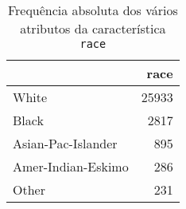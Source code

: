 \begin{table}
\centering
\caption{Frequência absoluta dos vários atributos da característica \texttt{race}}
\begin{tabular}{lr}
\toprule
{} &   race \\
\midrule
 White              &  25933 \\
 Black              &   2817 \\
 Asian-Pac-Islander &    895 \\
 Amer-Indian-Eskimo &    286 \\
 Other              &    231 \\
\bottomrule
\end{tabular}
\end{table}
